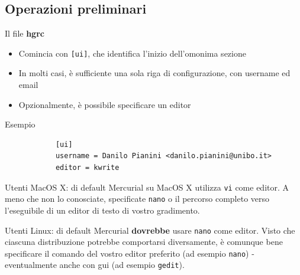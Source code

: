 \documentclass[presentation]{beamer}
\begin{document}
\subsection{Operazioni preliminari}


\begin{frame}[fragile]{Il file \textbf{hgrc}}
	\begin{itemize}
		\item Comincia con \texttt{[ui]}, che identifica l'inizio dell'omonima sezione
		\item In molti casi, è sufficiente una sola riga di configurazione, con username ed email
		\item Opzionalmente, è possibile specificare un editor
	\end{itemize}
	\begin{block}{Esempio}
		\begin{verbatim}
			[ui]
			username = Danilo Pianini <danilo.pianini@unibo.it>
			editor = kwrite
		\end{verbatim}
	\end{block}
	\scriptsize \alert{Utenti MacOS X}: di default Mercurial su MacOS X utilizza \texttt{vi} come editor. A meno che non lo conosciate, specificate \texttt{nano} o il percorso completo verso l'eseguibile di un editor di testo di vostro gradimento.
	
	\alert{Utenti Linux}: di default Mercurial \textbf{dovrebbe} usare \texttt{nano} come editor. Visto che ciascuna distribuzione potrebbe comportarsi diversamente, è comunque bene specificare il comando del vostro editor preferito (ad esempio \texttt{nano}) - eventualmente anche con gui (ad esempio \texttt{gedit}).

\end{frame}
\end{document}
